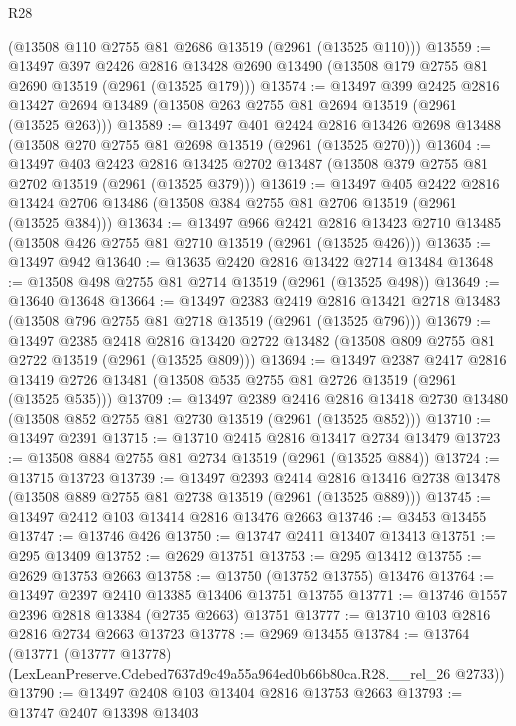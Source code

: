 \begin{lexlean}{R28}
\begin{coremodule}
    (@13508 @110 @2755 @81 @2686 @13519 (@2961 (@13525 @110)))
@13559 := @13497
    @397
    @2426
    @2816
    @13428
    @2690
    @13490
    (@13508 @179 @2755 @81 @2690 @13519 (@2961 (@13525 @179)))
@13574 := @13497
    @399
    @2425
    @2816
    @13427
    @2694
    @13489
    (@13508 @263 @2755 @81 @2694 @13519 (@2961 (@13525 @263)))
@13589 := @13497
    @401
    @2424
    @2816
    @13426
    @2698
    @13488
    (@13508 @270 @2755 @81 @2698 @13519 (@2961 (@13525 @270)))
@13604 := @13497
    @403
    @2423
    @2816
    @13425
    @2702
    @13487
    (@13508 @379 @2755 @81 @2702 @13519 (@2961 (@13525 @379)))
@13619 := @13497
    @405
    @2422
    @2816
    @13424
    @2706
    @13486
    (@13508 @384 @2755 @81 @2706 @13519 (@2961 (@13525 @384)))
@13634 := @13497
    @966
    @2421
    @2816
    @13423
    @2710
    @13485
    (@13508 @426 @2755 @81 @2710 @13519 (@2961 (@13525 @426)))
@13635 := @13497 @942
@13640 := @13635 @2420 @2816 @13422 @2714 @13484
@13648 := @13508 @498 @2755 @81 @2714 @13519 (@2961 (@13525 @498))
@13649 := @13640 @13648
@13664 := @13497
    @2383
    @2419
    @2816
    @13421
    @2718
    @13483
    (@13508 @796 @2755 @81 @2718 @13519 (@2961 (@13525 @796)))
@13679 := @13497
    @2385
    @2418
    @2816
    @13420
    @2722
    @13482
    (@13508 @809 @2755 @81 @2722 @13519 (@2961 (@13525 @809)))
@13694 := @13497
    @2387
    @2417
    @2816
    @13419
    @2726
    @13481
    (@13508 @535 @2755 @81 @2726 @13519 (@2961 (@13525 @535)))
@13709 := @13497
    @2389
    @2416
    @2816
    @13418
    @2730
    @13480
    (@13508 @852 @2755 @81 @2730 @13519 (@2961 (@13525 @852)))
@13710 := @13497 @2391
@13715 := @13710 @2415 @2816 @13417 @2734 @13479
@13723 := @13508 @884 @2755 @81 @2734 @13519 (@2961 (@13525 @884))
@13724 := @13715 @13723
@13739 := @13497
    @2393
    @2414
    @2816
    @13416
    @2738
    @13478
    (@13508 @889 @2755 @81 @2738 @13519 (@2961 (@13525 @889)))
@13745 := @13497 @2412 @103 @13414 @2816 @13476 @2663
@13746 := @3453 @13455
@13747 := @13746 @426
@13750 := @13747 @2411 @13407 @13413
@13751 := @295 @13409
@13752 := @2629 @13751
@13753 := @295 @13412
@13755 := @2629 @13753 @2663
@13758 := @13750 (@13752 @13755) @13476
@13764 := @13497 @2397 @2410 @13385 @13406 @13751 @13755
@13771 := @13746 @1557 @2396 @2818 @13384 (@2735 @2663) @13751
@13777 := @13710 @103 @2816 @2816 @2734 @2663 @13723
@13778 := @2969 @13455
@13784 := @13764
    (@13771 (@13777 @13778) (LexLeanPreserve.Cdebed7637d9c49a55a964ed0b66b80ca.R28.__rel_26 @2733))
@13790 := @13497 @2408 @103 @13404 @2816 @13753 @2663
@13793 := @13747 @2407 @13398 @13403

\end{coremodule}
\end{lexlean}
